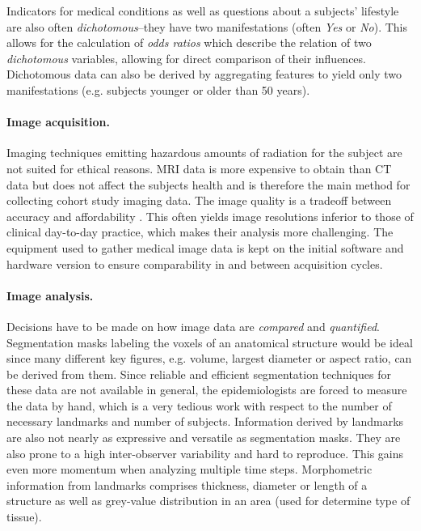\documentclass[journal]{style/vgtc} 			          %
\begin{document}
Indicators for medical conditions as well as questions about a subjects' lifestyle are also often \emph{dichotomous}--they have two manifestations (often \emph{Yes} or \emph{No}).
%
This allows for the calculation of \emph{odds ratios} which describe the relation of two \emph{dichotomous} variables, allowing for direct comparison of their influences.
%
Dichotomous data can also be derived by aggregating features to yield only two manifestations (e.g. subjects younger or older than 50 years).
%

\paragraph{Image acquisition.} \label{ImageAcquisition} Imaging techniques emitting hazardous amounts of radiation for the subject are not suited for ethical reasons.
%
MRI data is more expensive to obtain than CT data but does not affect the subjects health and is therefore the main method for collecting cohort study imaging data.
%
The image quality is a tradeoff between accuracy and affordability \cite{Preim2014}.
%
This often yields image resolutions inferior to those of clinical day-to-day practice, which makes their analysis more challenging.
%
The equipment used to gather medical image data is kept on the initial software and hardware version to ensure comparability in and between acquisition cycles.

\paragraph{Image analysis.} \label{ImageAnalysis} Decisions have to be made on how image data are \emph{compared} and \emph{quantified}.
%
Segmentation masks labeling the voxels of an anatomical structure would be ideal since many different key figures, e.g. volume, largest diameter or aspect ratio, can be derived from them.
%
Since reliable and efficient segmentation techniques for these data are not available in general, the epidemiologists are forced to measure the data by hand, which is a very tedious work with respect to the number of necessary landmarks and number of subjects.
%
Information derived by landmarks are also not nearly as expressive and versatile as segmentation masks.
%
They are also prone to a high inter-observer variability and hard to reproduce.
%
This gains even more momentum when analyzing multiple time steps.
%
Morphometric information from landmarks comprises thickness, diameter or length of a structure as well as grey-value distribution in an area (used for determine type of tissue).
\end{document}
